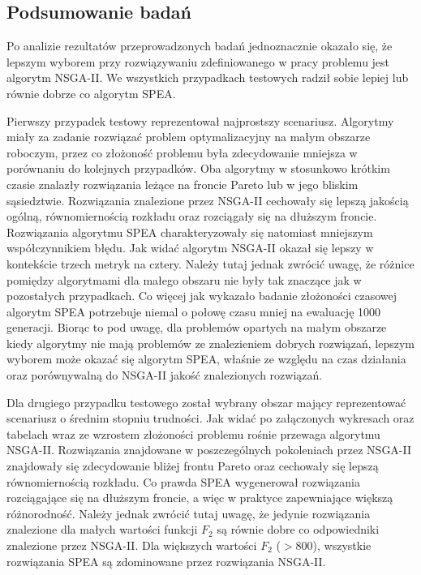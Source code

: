 \documentclass[twoside]{iisthesis}
\begin{document}
\subsection{Podsumowanie badań}
Po analizie rezultatów przeprowadzonych badań jednoznacznie okazało się, że lepszym wyborem przy rozwiązywaniu zdefiniowanego w pracy problemu jest algorytm NSGA-II. We wszystkich przypadkach testowych radził sobie lepiej lub równie dobrze co algorytm SPEA.

Pierwszy przypadek testowy reprezentował najprostszy scenariusz. Algorytmy miały za zadanie rozwiązać problem optymalizacyjny na małym obszarze roboczym, przez co złożoność problemu była zdecydowanie mniejsza w porównaniu do kolejnych przypadków. Oba algorytmy w stosunkowo krótkim czasie znalazły rozwiązania leżące na froncie Pareto lub w jego bliskim sąsiedztwie. Rozwiązania znalezione przez NSGA-II cechowały się lepszą jakością ogólną, równomiernością rozkładu oraz rozciągały się na dłuższym froncie. Rozwiązania algorytmu SPEA charakteryzowały się natomiast mniejszym współczynnikiem błędu. Jak widać algorytm NSGA-II okazał się lepszy w kontekście trzech metryk na cztery. Należy tutaj jednak zwrócić uwagę, że różnice pomiędzy algorytmami dla małego obszaru nie były tak znaczące jak w pozostałych przypadkach. Co więcej jak wykazało badanie złożoności czasowej algorytm SPEA potrzebuje niemal o połowę czasu mniej na ewaluację 1000 generacji. Biorąc to pod uwagę, dla problemów opartych na małym obszarze kiedy algorytmy nie mają problemów ze znalezieniem dobrych rozwiązań, lepszym wyborem może okazać się algorytm SPEA, właśnie ze względu na czas działania oraz porównywalną do NSGA-II jakość znalezionych rozwiązań.

Dla drugiego przypadku testowego został wybrany obszar mający reprezentować scenariusz o średnim stopniu trudności. Jak widać po załączonych wykresach oraz tabelach wraz ze wzrostem złożoności problemu rośnie przewaga algorytmu NSGA-II. Rozwiązania znajdowane w poszczególnych pokoleniach przez NSGA-II znajdowały się zdecydowanie bliżej frontu Pareto oraz cechowały się lepszą równomiernością rozkładu. Co prawda SPEA wygenerował rozwiązania rozciągające się na dłuższym froncie, a więc w praktyce zapewniające większą różnorodność. Należy jednak zwrócić tutaj uwagę, że jedynie rozwiązania znalezione dla małych wartości funkcji $F_{2}$ są równie dobre co odpowiedniki znalezione przez NSGA-II. Dla większych wartości $F_{2}$ ($> 800$), wszystkie rozwiązania SPEA są zdominowane przez rozwiązania NSGA-II.
\end{document}
